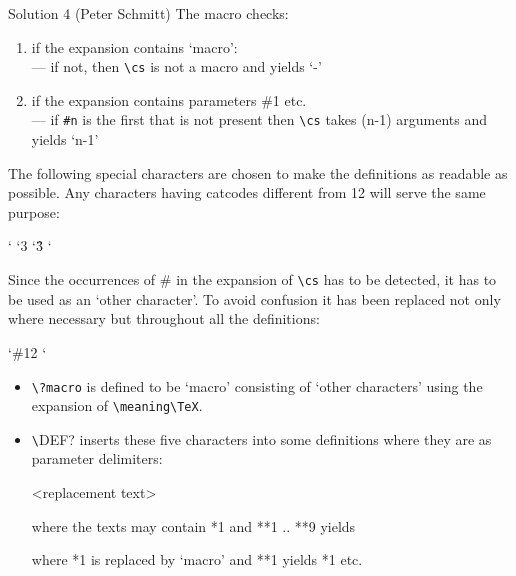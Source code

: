 \begin{solution}{Solution 4 (Peter Schmitt)}
 The macro \cmd{\args} checks:
\begin{enumerate}
\item if the expansion contains `macro': \\
      --- if not, then \verb?\cs? is not a macro and \cmd{\args} yields `-'
\item if the expansion contains parameters \#1 etc. \\
      --- if \verb?#n? is the first that is not present
             then \verb?\cs? takes (n-1) arguments
             and \cmd{\args} yields `n-1'
\end{enumerate}
 The following special characters are chosen to make the definitions as
 readable as possible. Any characters having catcodes different from 12
 will serve the same purpose:
\begin{lcode}
\catcode` \catcode`\/3  %
\catcode`\^3               %
\catcode`              %
\end{lcode}
 Since the occurrences of \# in the expansion of \cmd{\meaning}\verb?\cs? has to be
 detected, it has to be used as an `other character'.
 To avoid confusion it has been replaced not only where necessary but
 throughout all the definitions:
\begin{lcode}
\catcode`\#12  \catcode`   %
\end{lcode}
\begin{itemize}
\item \verb|\?macro| is defined to be `macro' consisting of `other characters'
      using the expansion of \verb?\meaning\TeX?.
\item  \verb?\?DEF? inserts these five characters into some definitions 
       where they are as parameter delimiters:
\begin{lcode}
    \DEF{} { <replacement text> }
\end{lcode}
         where the texts may contain *1 and **1 .. **9
 yields 
 where  *1 is replaced by `macro' and **1 yields *1 etc.
\end{itemize}



\end{solution}
